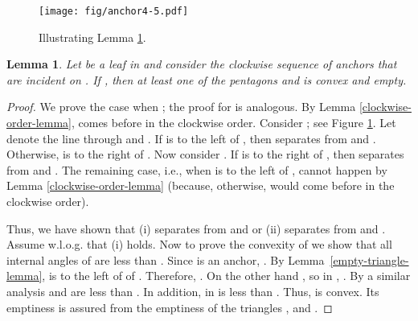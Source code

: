 \documentclass[11pt,a4paper]{article}
\newtheorem{lemma}{Lemma}
\begin{document}
\begin{figure}[ht]
  \centering
    \texttt{[image: fig/anchor4-5.pdf]}
  \caption{Illustrating Lemma \ref{separation-lemma}.}
\label{anchor4-5-fig}
\end{figure}

\begin{lemma}
\label{separation-lemma}
Let  be a leaf in  and consider the clockwise sequence  of anchors that are incident on . If , then at least one of the pentagons  and  is convex and empty.
\end{lemma}
\begin{proof}
We prove the case when ; the proof for  is analogous. By Lemma \ref{clockwise-order-lemma},  comes before  in the clockwise order. Consider ; see Figure \ref{anchor4-5-fig}. Let  denote the line through  and . If  is to the left of , then  separates  from  and . Otherwise,  is to the right of . Now consider . If  is to the right of , then  separates  from  and . The remaining case, i.e., when  is to the left of , cannot happen by Lemma \ref{clockwise-order-lemma} (because, otherwise,  would come before  in the clockwise order).

Thus, we have shown that (i)  separates  from  and  or (ii)  separates  from  and . Assume w.l.o.g. that (i) holds. Now to prove the convexity of  we show that all internal angles of  are less than . Since  is an anchor, . By Lemma~\ref{empty-triangle-lemma},  is to the left of of . Therefore, . On the other hand , so in , . By a similar analysis  and  are less than . In addition,  in  is less than . Thus,  is convex. Its emptiness is assured from the emptiness of the triangles ,  and .
\end{proof}
\end{document}
